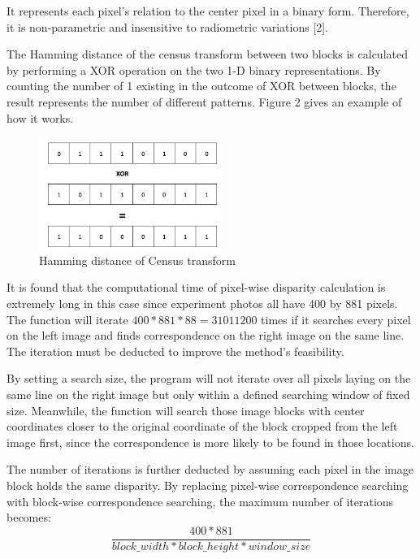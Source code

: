 \documentclass[conference]{IEEEtran}
\begin{document}
It represents each pixel's relation to the center pixel in a binary form. Therefore, it is non-parametric and insensitive to radiometric variations [2].

The Hamming distance of the census transform between two blocks is calculated by performing a XOR operation on the two 1-D binary representations. By counting the number of 1 existing in the outcome of XOR between blocks, the result represents the number of different patterns. Figure 2 gives an example of how it works.

\begin{figure}[H]
    \centering
    \includegraphics[width=6cm]{fig2.png}
    \caption{Hamming distance of Census transform}
\end{figure}

It is found that the computational time of pixel-wise disparity calculation is extremely long in this case since experiment photos all have 400 by 881 pixels. The function will iterate $400*881*88=31011200$ times if it searches every pixel on the left image and finds correspondence on the right image on the same line. The iteration must be deducted to improve the method's feasibility.

By setting a search size, the program will not iterate over all pixels laying on the same line on the right image but only within a defined searching window of fixed size. Meanwhile, the function will search those image blocks with center coordinates closer to the original coordinate of the block cropped from the left image first, since the correspondence is more likely to be found in those locations.

The number of iterations is further deducted by assuming each pixel in the image block holds the same disparity. By replacing pixel-wise correspondence searching with block-wise correspondence searching, the maximum number of iterations becomes:
\begin{equation*}
    \frac{400*881}{block\_width*block\_height*window\_size}
\end{equation*}
\end{document}
